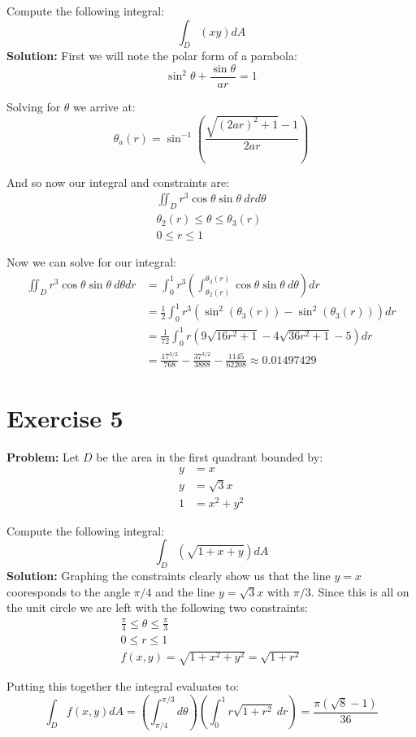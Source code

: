 \documentclass{article}
\begin{document}
Compute the following integral:
$$\int_D\left(xy\right)dA$$
\textbf{Solution:} First we will note the polar form of a parabola:
$$\sin^2\theta+\frac{\sin\theta}{ar}=1$$

Solving for $\theta$ we arrive at:
$$\theta_a(r)=\sin^{-1}\left(\frac{\sqrt{(2ar)^2+1}-1}{2ar}\right)$$

And so now our integral and constraints are:
\begin{gather*}
  \iint_Dr^3\cos\theta\sin\theta\ drd\theta\\
  \theta_2(r)\le\theta\le\theta_3(r)\\
  0\le r\le1
\end{gather*}

Now we can solve for our integral:
\begin{align*}
  \iint_Dr^3\cos\theta\sin\theta\ d\theta dr&=\int_0^1r^3\left(\int^{\theta_3(r)}_{\theta_2(r)}\cos\theta\sin\theta\ d\theta\right)dr\\
  &=\frac{1}{2}\int_0^1r^3(\sin^2(\theta_3(r))-\sin^2(\theta_3(r)))dr\\
  &=\frac{1}{72}\int_0^1r(9\sqrt{16r^2+1}-4\sqrt{36r^2+1}-5)dr\\
  &=\frac{17^{3/2}}{768}-\frac{37^{3/2}}{3888}-\frac{1145}{62208}\approx0.01497429
\end{align*}

\section*{Exercise 5}
\textbf{Problem:} Let $D$ be the area in the first quadrant bounded by:
\begin{align*}
  y&=x\\
  y&=\sqrt{3}x\\
  1&=x^2+y^2
\end{align*}

Compute the following integral:
$$\int_D\left(\sqrt{1+x+y}\right)dA$$
\textbf{Solution:} Graphing the constraints clearly show us that the line $y=x$ cooresponds to the angle $\pi/4$ and the line $y=\sqrt 3x$ with $\pi/3$. Since this is all on the unit circle we are left with the following two constraints:
\begin{gather*}
  \frac{\pi}{4}\le\theta\le\frac{\pi}{3}\\
  0\le r\le1\\
  f(x,y)=\sqrt{1+x^2+y^2}=\sqrt{1+r^2}
\end{gather*}

Putting this together the integral evaluates to:
$$\int_Df(x,y)dA=\left(\int^{\pi/3}_{\pi/4}d\theta\right)\left(\int_0^1r\sqrt{1+r^2}\ dr\right)=\frac{\pi(\sqrt 8 -1)}{36}$$
\end{document}
